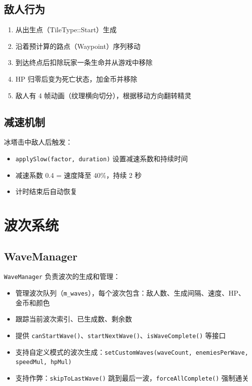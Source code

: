 \documentclass[12pt,a4paper]{ctexart}
\begin{document}
\subsection{敌人行为}

\begin{enumerate}
    \item 从出生点（TileType::Start）生成
    \item 沿着预计算的路点（Waypoint）序列移动
    \item 到达终点后扣除玩家一条生命并从游戏中移除
    \item HP 归零后变为死亡状态，加金币并移除
    \item 敌人有 4 帧动画（纹理横向切分），根据移动方向翻转精灵
\end{enumerate}

\subsection{减速机制}

冰塔击中敌人后触发：
\begin{itemize}
    \item \texttt{applySlow(factor, duration)} 设置减速系数和持续时间
    \item 减速系数 0.4 = 速度降至 40\%，持续 2 秒
    \item 计时结束后自动恢复
\end{itemize}


\section{波次系统}

\subsection{WaveManager}

\texttt{WaveManager} 负责波次的生成和管理：

\begin{itemize}
    \item 管理波次队列（\texttt{m\_waves}），每个波次包含：敌人数、生成间隔、速度、HP、金币和颜色
    \item 跟踪当前波次索引、已生成数、剩余数
    \item 提供 \texttt{canStartWave()}、\texttt{startNextWave()}、\texttt{isWaveComplete()} 等接口
    \item 支持自定义模式的波次生成：\texttt{setCustomWaves(waveCount, enemiesPerWave, speedMul, hpMul)}
    \item 支持作弊：\texttt{skipToLastWave()} 跳到最后一波，\texttt{forceAllComplete()} 强制通关
\end{itemize}
\end{document}
